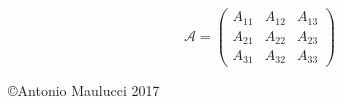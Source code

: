 \documentclass[a4paper]{article}
\begin{document}
$$
{\mathcal A} %
=
\left( %
\begin{array}{ccc} %
    A_{11} & A_{12} & A_{13}\\
    A_{21} & A_{22} & A_{23}\\
    A_{31} & A_{32} & A_{33}
\end{array}
\right) %
$$


\vspace{4cm}
\begin{center}
\copyright Antonio Maulucci 2017
\end{center}
\end{document}
